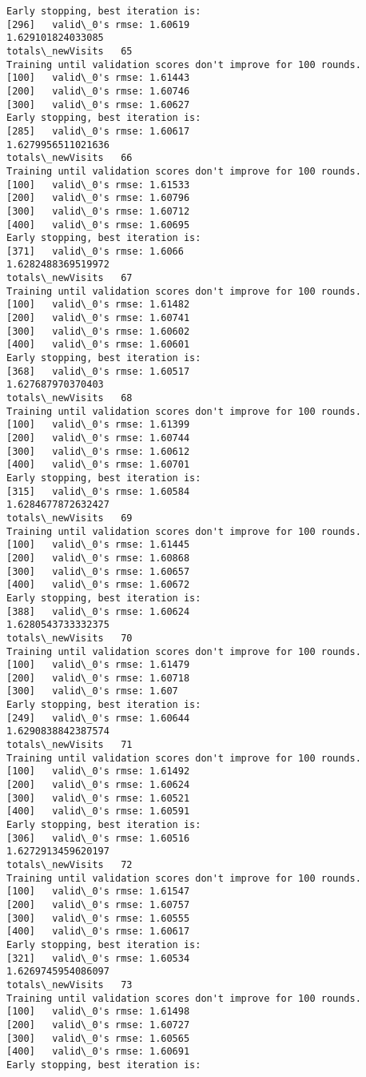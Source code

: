 \documentclass[11pt]{article}
\begin{document}
\begin{Verbatim}[commandchars=\\\{\}]
Early stopping, best iteration is:
[296]	valid\_0's rmse: 1.60619
1.629101824033085
totals\_newVisits   65
Training until validation scores don't improve for 100 rounds.
[100]	valid\_0's rmse: 1.61443
[200]	valid\_0's rmse: 1.60746
[300]	valid\_0's rmse: 1.60627
Early stopping, best iteration is:
[285]	valid\_0's rmse: 1.60617
1.6279956511021636
totals\_newVisits   66
Training until validation scores don't improve for 100 rounds.
[100]	valid\_0's rmse: 1.61533
[200]	valid\_0's rmse: 1.60796
[300]	valid\_0's rmse: 1.60712
[400]	valid\_0's rmse: 1.60695
Early stopping, best iteration is:
[371]	valid\_0's rmse: 1.6066
1.6282488369519972
totals\_newVisits   67
Training until validation scores don't improve for 100 rounds.
[100]	valid\_0's rmse: 1.61482
[200]	valid\_0's rmse: 1.60741
[300]	valid\_0's rmse: 1.60602
[400]	valid\_0's rmse: 1.60601
Early stopping, best iteration is:
[368]	valid\_0's rmse: 1.60517
1.627687970370403
totals\_newVisits   68
Training until validation scores don't improve for 100 rounds.
[100]	valid\_0's rmse: 1.61399
[200]	valid\_0's rmse: 1.60744
[300]	valid\_0's rmse: 1.60612
[400]	valid\_0's rmse: 1.60701
Early stopping, best iteration is:
[315]	valid\_0's rmse: 1.60584
1.6284677872632427
totals\_newVisits   69
Training until validation scores don't improve for 100 rounds.
[100]	valid\_0's rmse: 1.61445
[200]	valid\_0's rmse: 1.60868
[300]	valid\_0's rmse: 1.60657
[400]	valid\_0's rmse: 1.60672
Early stopping, best iteration is:
[388]	valid\_0's rmse: 1.60624
1.6280543733332375
totals\_newVisits   70
Training until validation scores don't improve for 100 rounds.
[100]	valid\_0's rmse: 1.61479
[200]	valid\_0's rmse: 1.60718
[300]	valid\_0's rmse: 1.607
Early stopping, best iteration is:
[249]	valid\_0's rmse: 1.60644
1.6290838842387574
totals\_newVisits   71
Training until validation scores don't improve for 100 rounds.
[100]	valid\_0's rmse: 1.61492
[200]	valid\_0's rmse: 1.60624
[300]	valid\_0's rmse: 1.60521
[400]	valid\_0's rmse: 1.60591
Early stopping, best iteration is:
[306]	valid\_0's rmse: 1.60516
1.6272913459620197
totals\_newVisits   72
Training until validation scores don't improve for 100 rounds.
[100]	valid\_0's rmse: 1.61547
[200]	valid\_0's rmse: 1.60757
[300]	valid\_0's rmse: 1.60555
[400]	valid\_0's rmse: 1.60617
Early stopping, best iteration is:
[321]	valid\_0's rmse: 1.60534
1.6269745954086097
totals\_newVisits   73
Training until validation scores don't improve for 100 rounds.
[100]	valid\_0's rmse: 1.61498
[200]	valid\_0's rmse: 1.60727
[300]	valid\_0's rmse: 1.60565
[400]	valid\_0's rmse: 1.60691
Early stopping, best iteration is:

\end{Verbatim}
\end{document}
